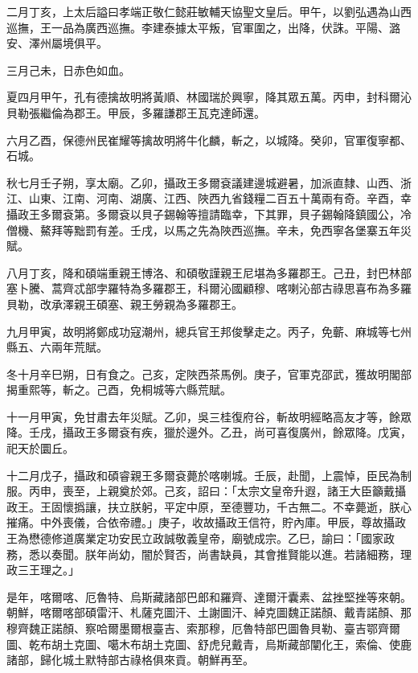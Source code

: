 \begin{pinyinscope}
二月丁亥，上太后謚曰孝端正敬仁懿莊敏輔天協聖文皇后。甲午，以劉弘遇為山西巡撫，王一品為廣西巡撫。李建泰據太平叛，官軍圍之，出降，伏誅。平陽、潞安、澤州屬境俱平。

三月己未，日赤色如血。

夏四月甲午，孔有德擒故明將黃順、林國瑞於興寧，降其眾五萬。丙申，封科爾沁貝勒張繼倫為郡王。甲辰，多羅謙郡王瓦克達師還。

六月乙酉，保德州民崔耀等擒故明將牛化麟，斬之，以城降。癸卯，官軍復寧都、石城。

秋七月壬子朔，享太廟。乙卯，攝政王多爾袞議建邊城避暑，加派直隸、山西、浙江、山東、江南、河南、湖廣、江西、陜西九省錢糧二百五十萬兩有奇。辛酉，幸攝政王多爾袞第。多爾袞以貝子錫翰等擅請臨幸，下其罪，貝子錫翰降鎮國公，冷僧機、鰲拜等黜罰有差。壬戌，以馬之先為陜西巡撫。辛未，免西寧各堡寨五年災賦。

八月丁亥，降和碩端重親王博洛、和碩敬謹親王尼堪為多羅郡王。己丑，封巴林部塞卜騰、蒿齊忒部孛羅特為多羅郡王，科爾沁國顧穆、喀喇沁部古祿思喜布為多羅貝勒，改承澤親王碩塞、親王勞親為多羅郡王。

九月甲寅，故明將鄭成功寇潮州，總兵官王邦俊擊走之。丙子，免蘄、麻城等七州縣五、六兩年荒賦。

冬十月辛巳朔，日有食之。己亥，定陜西茶馬例。庚子，官軍克邵武，獲故明閣部揭重熙等，斬之。己酉，免桐城等六縣荒賦。

十一月甲寅，免甘肅去年災賦。乙卯，吳三桂復府谷，斬故明經略高友才等，餘眾降。壬戌，攝政王多爾袞有疾，獵於邊外。乙丑，尚可喜復廣州，餘眾降。戊寅，祀天於圜丘。

十二月戊子，攝政和碩睿親王多爾袞薨於喀喇城。壬辰，赴聞，上震悼，臣民為制服。丙申，喪至，上親奠於郊。己亥，詔曰：「太宗文皇帝升遐，諸王大臣籲戴攝政王。王固懷撝讓，扶立朕躬，平定中原，至德豐功，千古無二。不幸薨逝，朕心摧痛。中外喪儀，合依帝禮。」庚子，收故攝政王信符，貯內庫。甲辰，尊故攝政王為懋德修道廣業定功安民立政誠敬義皇帝，廟號成宗。乙巳，諭曰：「國家政務，悉以奏聞。朕年尚幼，闇於賢否，尚書缺員，其會推賢能以進。若諸細務，理政三王理之。」

是年，喀爾喀、厄魯特、烏斯藏諸部巴郎和羅齊、達爾汗囊素、盆挫堅挫等來朝。朝鮮，喀爾喀部碩雷汗、札薩克圖汗、土謝圖汗、綽克圖魏正諾顏、戴青諾顏、那穆齊魏正諾顏、察哈爾墨爾根臺吉、索那穆，厄魯特部巴圖魯貝勒、臺吉鄂齊爾圖、乾布胡土克圖、噶木布胡土克圖、舒虎兒戴青，烏斯藏部闡化王，索倫、使鹿諸部，歸化城土默特部古祿格俱來貢。朝鮮再至。


\end{pinyinscope}
